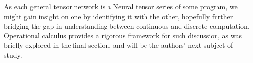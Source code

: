 \documentclass[smallcondensed]{svjour3}
\begin{document}
As each general tensor network is a Neural tensor series of some program, we might gain insight on one by identifying it with the other,
hopefully further bridging the gap in understanding between continuous and discrete computation.
 Operational calculus provides a rigorous framework for such discussion, as was briefly explored in the final section, and will be the authors' next subject of study.


\nocite{*}

\end{document}
